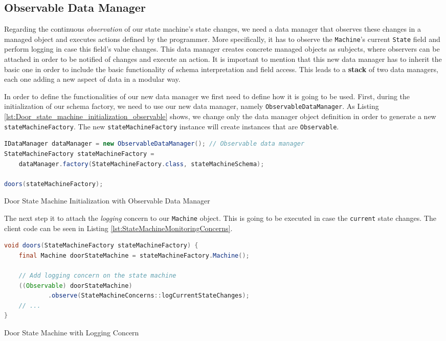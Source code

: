 \subsection{Observable Data Manager}
Regarding the continuous \textit{observation} of our state machine's state changes, we need a data manager that observes these changes in a managed object and executes actions defined by the programmer.
More specifically, it has to observe the \texttt{Machine}'s current \texttt{State} field and perform logging in case this field's value changes.
This data manager creates concrete managed objects as subjects, where observers can be attached in order to be notified of changes and execute an action.
It is important to mention that this new data manager has to inherit the basic one in order to include the basic functionality of schema interpretation and field access.
This leads to a \textbf{stack} of two data managers, each one adding a new aspect of data in a modular way.

In order to define the functionalities of our new data manager we first need to define how it is going to be used.
First, during the initialization of our schema factory, we need to use our new data manager, namely \texttt{ObservableDataManager}.
As Listing \ref{lst:Door_state_machine_initialization_observable} shows, we change only the data manager object definition in order to generate a new \texttt{stateMachineFactory}.
The new \texttt{stateMachineFactory} instance will create instances that are \texttt{Observable}.

\begin{sourcecode} [H]
	\begin{lstlisting}[language=Java, escapechar=|]
IDataManager dataManager = new ObservableDataManager(); // Observable data manager
StateMachineFactory stateMachineFactory =
	dataManager.factory(StateMachineFactory.class, stateMachineSchema);

doors(stateMachineFactory);
	\end{lstlisting}
	\caption{Door State Machine Initialization with Observable Data Manager}
	\label{lst:Door_state_machine_initialization_observable}
\end{sourcecode}

The next step it to attach the \textit{logging} concern to our \texttt{Machine} object. 
This is going to be executed in case the \texttt{current} state changes.
The client code can be seen in Listing \ref{lst:StateMachineMonitoringConcerns}.

\begin{sourcecode} [H]
	\begin{lstlisting}[language=Java, escapechar=|]
void doors(StateMachineFactory stateMachineFactory) {
	final Machine doorStateMachine = stateMachineFactory.Machine();

	// Add logging concern on the state machine
	((Observable) doorStateMachine)
			.observe(StateMachineConcerns::logCurrentStateChanges);
	// ...
}
	\end{lstlisting}
	\caption{Door State Machine with Logging Concern}
	\label{lst:StateMachineMonitoringConcerns}
\end{sourcecode}

